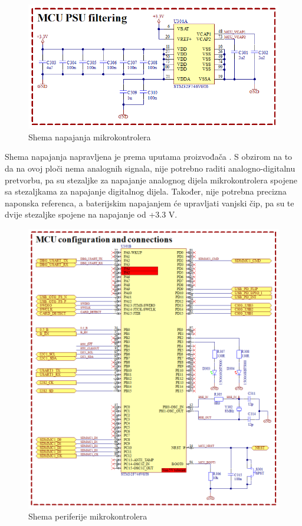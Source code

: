 \begin{figure}[hbt]
    \centering
    \includegraphics[width=\textwidth]{Figures/MCU_02.png}
    \caption{Shema napajanja mikrokontrolera}
    \label{slk:MCU_PS}
\end{figure}

Shema napajanja napravljena je prema uputama proizvođača \cite{stmicroelectronics:an4661}. S obzirom na to da na ovoj ploči nema analognih signala, nije potrebno raditi analogno-digitalnu pretvorbu, pa su stezaljke za napajanje analognog dijela mikrokontrolera spojene sa stezaljkama za napajanje digitalnog dijela. Također, nije potrebna precizna naponska referenca, a baterijskim napajanjem će upravljati vanjski čip, pa su te dvije stezaljke spojene na napajanje od +3.3 V.
\newpage

\begin{figure}[hbt]
    \centering
    \includegraphics[width=\textwidth]{Figures/MCU_01.png}
    \caption{Shema periferije mikrokontrolera}
    \label{slk:MCU_PE}
\end{figure}

